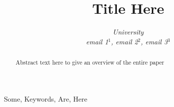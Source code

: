 \documentclass[conference]{IEEEtran}
\begin{document}
\title{Title Here}

\author{
\textit{University}\\
\textit{email 1$^{1}$, email 2$^{2}$, email 3$^{3}$}}

  \maketitle

  \begin{abstract}
    Abstract text here to give an overview of the entire paper
  \end{abstract}

  \begin{IEEEkeywords}
    Some, Keywords, Are, Here

  \end{IEEEkeywords}

  
  
\end{document}
